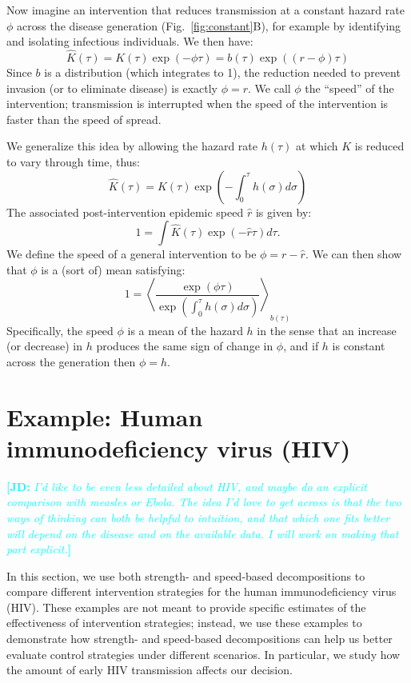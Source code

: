 \documentclass[12pt]{article}
\newcommand{\comment}[3]{\textcolor{#1}{\textbf{[#2: }\textit{#3}\textbf{]}}}
\newcommand{\jd}[1]{\comment{cyan}{JD}{#1}}
\newcommand{\figref}[1]{Fig.~\ref{fig:#1}}
\begin{document}
Now imagine an intervention that reduces transmission at a constant hazard rate $\phi$ across the disease generation (\figref{constant}B), for example by identifying and isolating infectious individuals.
We then have:
\begin{equation}
	\hat K(\tau) = K(\tau)\exp(-\phi\tau) = b(\tau)\exp((r-\phi)\tau)
\end{equation}
Since $b$ is a distribution (which integrates to 1), the reduction needed to prevent invasion (or to eliminate disease)  is exactly $\phi=r$. 
We call $\phi$ the ``speed'' of the intervention; transmission is interrupted when the speed of the intervention is faster than the speed of spread.

We generalize this idea by allowing the hazard rate $h(\tau)$ at which $K$ is reduced to vary through time, thus:
\begin{equation}
	\hat K(\tau) = K(\tau) \exp\left(-\int_0^\tau h(\sigma) d\sigma\right)
\end{equation}
The associated post-intervention epidemic speed $\hat r$ is given by:
\begin{equation}
	1 = \int \hat K(\tau) \exp(-\hat r\tau) d\tau.	
\end{equation}
We define the speed of a general intervention to be $\phi = r - \hat r$. 
We can then show that $\phi$ is a (sort of) mean satisfying:
\begin{equation}
	1 = \left\langle \frac{\exp(\phi \tau) }{\exp\left(\int_0^\tau h(\sigma) d\sigma\right)} \right\rangle_{b(\tau)}
\end{equation}
Specifically, the speed $\phi$ is a mean of the hazard $h$ in the sense that an increase (or decrease) in $h$ produces the same sign of change in $\phi$, and if $h$ is constant across the generation then $\phi=h$.

\section{Example: Human immunodeficiency virus (HIV)}

\jd{I'd like to be even less detailed about HIV, and maybe do an explicit comparison with measles or Ebola. The idea I'd love to get across is that the two ways of thinking can both be helpful to intuition, and that which one fits better will depend on the disease and on the available data. I will work on making that part explicit.}

In this section, we use both strength- and speed-based decompositions to compare different intervention strategies for the human immunodeficiency virus (HIV). 
These examples are not meant to provide specific estimates of the effectiveness of intervention strategies; 
instead, we use these examples to demonstrate how strength- and speed-based decompositions can help us better evaluate control strategies under different scenarios.
In particular, we study how the amount of early HIV transmission affects our decision.
\end{document}
